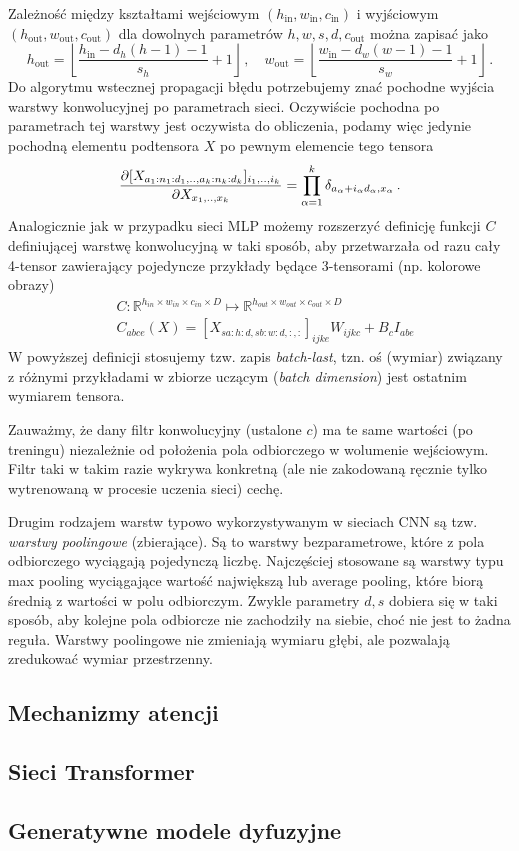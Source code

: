 \documentclass{myclass}
\begin{document}
Zależność między kształtami wejściowym \((h_\text{in},w_\text{in},c_\text{in})\) i wyjściowym
\((h_\text{out},w_\text{out},c_\text{out})\) dla dowolnych parametrów \(h,w,s,d,c_\text{out}\) można
zapisać jako 
\begin{equation*}
    h_\text{out} = \left\lfloor \frac{h_\text{in} - d_h(h-1) - 1}{s_h} + 1\right\rfloor\,,\quad w_\text{out} = \left\lfloor \frac{w_\text{in} - d_w(w-1) - 1}{s_w} + 1\right\rfloor\,.
\end{equation*}
Do algorytmu wstecznej propagacji błędu potrzebujemy znać pochodne wyjścia warstwy konwolucyjnej po
parametrach sieci. Oczywiście pochodna po parametrach tej warstwy jest oczywista do obliczenia,
podamy więc jedynie pochodną elementu podtensora \(X\) po pewnym elemencie tego tensora
\begin{equation*}
    \pdv{[X_{a_1:n_1:d_1,..,a_k:n_k:d_k}]_{i_1,..,i_k}}{X_{x_1,..,x_k}} = \prod_{\alpha=1}^k \delta_{a_\alpha + i_\alpha d_\alpha, x_\alpha}\,.
\end{equation*}
Analogicznie jak w przypadku sieci MLP możemy rozszerzyć definicję funkcji \(C\) definiującej
warstwę konwolucyjną w taki sposób, aby przetwarzała od razu cały 4-tensor zawierający pojedyncze
przykłady będące 3-tensorami (np. kolorowe obrazy)
\begin{equation*}
    \begin{split}
        &C: \mathbb{R}^{h_{in}\times w_{in}\times c_{in}\times D} \mapsto \mathbb{R}^{h_{out}\times w_{out}\times c_{out}\times D}\\
        &C_{abce}(X) = [X_{sa:h:d,sb:w:d,:,:}]_{ijke}W_{ijkc} + B_c I_{abe}
    \end{split}
\end{equation*}
W powyższej definicji stosujemy tzw. zapis \textit{batch-last}, tzn. oś (wymiar) związany z różnymi
przykładami w zbiorze uczącym (\textit{batch dimension}) jest ostatnim wymiarem tensora.

Zauważmy, że dany filtr konwolucyjny (ustalone \(c\)) ma te same wartości (po treningu) niezależnie
od położenia pola odbiorczego w wolumenie wejściowym. Filtr taki w takim razie wykrywa konkretną
(ale nie zakodowaną ręcznie tylko wytrenowaną w procesie uczenia sieci) cechę.

Drugim rodzajem warstw typowo wykorzystywanym w sieciach CNN są tzw. \textit{warstwy poolingowe}
(zbierające). Są to warstwy bezparametrowe, które z pola odbiorczego wyciągają pojedynczą liczbę.
Najczęściej stosowane są warstwy typu max pooling wyciągające wartość największą lub average
pooling, które biorą średnią z wartości w polu odbiorczym. Zwykle parametry \(d, s\) dobiera się w
taki sposób, aby kolejne pola odbiorcze nie zachodziły na siebie, choć nie jest to żadna reguła.
Warstwy poolingowe nie zmieniają wymiaru głębi, ale pozwalają zredukować wymiar przestrzenny.

\subsection{Mechanizmy atencji}
\subsection{Sieci Transformer}
\subsection{Generatywne modele dyfuzyjne}
\end{document}
